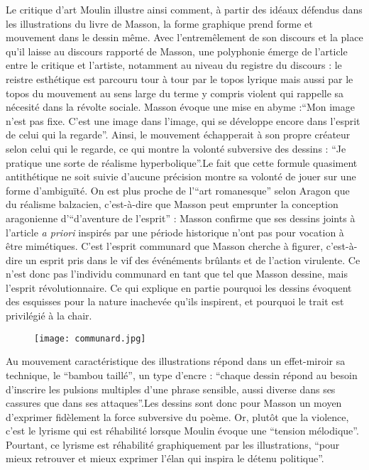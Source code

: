 Le critique d'art Moulin illustre ainsi comment, à partir des idéaux défendus dans les illustrations du livre de Masson, la forme graphique prend forme et mouvement dans le dessin même. Avec l'entremêlement de son discours et la place qu'il laisse au discours rapporté de Masson, une polyphonie émerge de l'article entre le critique et l'artiste, notamment au niveau du registre du discours : le reistre esthétique est parcouru tour à tour par le topos lyrique mais aussi par le topos du mouvement au sens large du terme y compris violent qui rappelle sa nécesité dans la révolte sociale. Masson évoque une mise en abyme :\enquote{Mon image n’est pas fixe. C’est une image dans l’image, qui se développe encore dans l’esprit de celui qui la regarde}. Ainsi, le mouvement échapperait à son propre créateur selon celui qui le regarde, ce qui montre la volonté subversive des dessins : \enquote{Je pratique une sorte de réalisme hyperbolique}.Le fait que cette formule quasiment antithétique ne soit suivie d’aucune précision montre sa volonté de jouer sur une forme d’ambiguïté. On est plus proche de l’\enquote{art romanesque} selon Aragon que du réalisme balzacien, c'est-à-dire que Masson peut emprunter la conception aragonienne d'\enquote{d'aventure de l'esprit} : Masson confirme que ses dessins joints à l'article \emph{a priori} inspirés par une période historique n'ont pas pour vocation à être mimétiques. C'est l'esprit communard que Masson cherche à figurer, c'est-à-dire un esprit pris dans le vif des événéments brûlants et de l'action virulente. Ce n'est donc pas l'individu communard en tant que tel que Masson dessine, mais l'esprit révolutionnaire. Ce qui explique en partie pourquoi les dessins évoquent des esquisses pour la nature inachevée qu'ils inspirent, et pourquoi le trait est privilégié à la chair. 

\begin{figure}[H]
   \centering
   \texttt{[image: communard.jpg]}
	\caption{\cite{commune}}\label{fig:Parisicommunard}
\end{figure}


	Au mouvement caractéristique des illustrations répond dans un effet-miroir sa technique, le \enquote{bambou taillé}, un type d’encre : \enquote{chaque dessin répond au besoin d’inscrire les pulsions multiples d’une phrase sensible, aussi diverse dans ses cassures que dans ses attaques}.Les dessins sont donc pour Masson un moyen d’exprimer fidèlement la force subversive du poème. Or, plutôt que la violence, c’est le lyrisme qui est réhabilité lorsque Moulin évoque une \enquote{tension mélodique}. Pourtant, ce lyrisme est réhabilité graphiquement par les illustrations, \enquote{pour mieux retrouver et mieux exprimer l’élan qui inspira le détenu politique}. 

